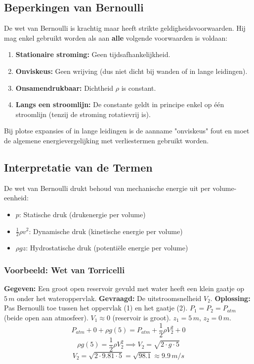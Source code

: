 \documentclass[a4paper,11pt,twoside]{report}
\begin{document}
\subsection{Beperkingen van Bernoulli}
De wet van Bernoulli is krachtig maar heeft strikte geldigheidsvoorwaarden. Hij mag enkel gebruikt worden als aan \textbf{alle} volgende voorwaarden is voldaan:
\begin{enumerate}
    \item \textbf{Stationaire stroming:} Geen tijdsafhankelijkheid.
    \item \textbf{Onviskeus:} Geen wrijving (dus niet dicht bij wanden of in lange leidingen).
    \item \textbf{Onsamendrukbaar:} Dichtheid $\rho$ is constant.
    \item \textbf{Langs een stroomlijn:} De constante geldt in principe enkel op één stroomlijn (tenzij de stroming rotatievrij is).
\end{enumerate}
Bij plotse expansies of in lange leidingen is de aanname "onviskeus" fout en moet de algemene energievergelijking met verliestermen gebruikt worden.

\subsection{Interpretatie van de Termen}
De wet van Bernoulli drukt behoud van mechanische energie uit per volume-eenheid:
\begin{itemize}
    \item $p$: Statische druk (drukenergie per volume)
    \item $\frac{1}{2}\rho v^2$: Dynamische druk (kinetische energie per volume)
    \item $\rho g z$: Hydrostatische druk (potentiële energie per volume)
\end{itemize}

\subsubsection*{Voorbeeld: Wet van Torricelli}
\textbf{Gegeven:} Een groot open reservoir gevuld met water heeft een klein gaatje op $5 \, m$ onder het wateroppervlak.
\textbf{Gevraagd:} De uitstroomsnelheid $V_2$.
\textbf{Oplossing:}
Pas Bernoulli toe tussen het oppervlak (1) en het gaatje (2).
$P_1 = P_2 = P_{atm}$ (beide open aan atmosfeer).
$V_1 \approx 0$ (reservoir is groot).
$z_1 = 5 \, m$, $z_2 = 0 \, m$.
\[
P_{atm} + 0 + \rho g (5) = P_{atm} + \frac{1}{2} \rho V_2^2 + 0
\]
\[
\rho g (5) = \frac{1}{2} \rho V_2^2 \implies V_2 = \sqrt{2 \cdot g \cdot 5}
\]
\[
V_2 = \sqrt{2 \cdot 9.81 \cdot 5} = \sqrt{98.1} \approx 9.9 \, m/s
\]
\end{document}
